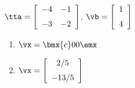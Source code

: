 {$\tta = \left[ \begin {array}{cc} -4&-1\\\noalign{\medskip}-3&-2\end {array}
 \right]$, $\vb=\left[ \begin {array}{c} 1\\\noalign{\medskip}4\end {array} \right]$}
{\begin{enumerate}
\item	 $\vx=\bmx{c}0\\0\emx$
\item	 $\vx=\left[ \begin {array}{c} 2/5\\ \noalign{\medskip}-13/5
\end {array} \right]$
\end{enumerate}
 }







